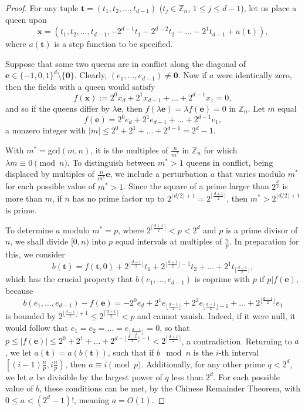 \documentclass[11pt]{article}
\begin{document}
\begin{proof}
For any tuple $\mathbf{t}=(t_1,t_2,\dots,t_{d-1})$ ($t_j\in \mathbb{Z}_n$, $1\le j\le d-1$), let us place a queen upon
$$\mathbf{x}=(t_1,t_2,\dots,t_{d-1},-2^{d-1}t_1-2^{d-2}t_2-\ldots-2^1 t_{d-1}+a(\mathbf{t})),$$
where $a(\mathbf{t})$ is a step function to be specified.

Suppose that some two queens are in conflict along the diagonal of $\mathbf{e}\in \{-1,0,1\}^d\setminus \{\mathbf{0}\}$. Clearly, $(e_1,\dots,e_{d-1})\neq \mathbf{0}$. Now if $a$ were identically zero, then the fields with a queen would satisfy
$$f(\mathbf{x}):=2^0 x_d+2^1x_{d-1}+\ldots +2^{d-1}x_1=0,$$
and so if the queens differ by $\lambda \mathbf{e}$, then $f(\lambda \mathbf{e})=\lambda f(\mathbf{e})=0$ in $\mathbb{Z}_n$. Let $m$ equal
$$f(\mathbf{e})=2^0 e_d+2^1e_{d-1}+\ldots +2^{d-1}e_1,$$ 
a nonzero integer with $|m|\le 2^0+2^1+\ldots +2^{d-1}=2^d-1$. 

With $m^*=\text{gcd}(m,n)$, it is the multiples of $\frac{n}{m^*}$ in $\mathbb{Z}_n$ for which $\lambda m\equiv 0\pmod n$. To distinguish between $m^*>1$ queens in conflict, being displaced by multiples of $\frac{n}{m^*}\mathbf{e}$, we include a perturbation $a$ that varies modulo $m^*$ for each possible value of $m^*>1$. Since the square of a prime larger than $2^{\frac d2}$ is more than $m$, if $n$ has no prime factor up to $2^{\lfloor d/2\rfloor +1}=2^{\lceil \frac{d+1}{2}\rceil}$, then $m^*> 2^{\lfloor d/2\rfloor +1}$ is prime.

To determine $a$ modulo $m^*=p$, where $2^{\lceil \frac{d+1}{2}\rceil}<p<2^d$ and $p$ is a prime divisor of $n$, we shall divide $[0,n)$ into $p$ equal intervals at multiples of $\frac{n}{p}$. In preparation for this, we consider
$$b(\mathbf{t})=f(\mathbf{t},0)+2^{\lfloor \frac{d-1}{2}\rfloor}t_1+2^{\lfloor \frac{d-1}{2}\rfloor-1}t_2+\ldots + 2^1t_{\lfloor \frac{d-1}{2}\rfloor},$$
which has the crucial property that $b(e_1,\ldots,e_{d-1})$ is coprime with $p$ if $p|f(\mathbf{e})$, because
$$b(e_1,\ldots,e_{d-1})-f(\mathbf{e})=-2^0e_d+2^1e_{\lfloor \frac{d-1}{2}\rfloor}+2^2e_{\lfloor \frac{d-1}{2}\rfloor-1}+\ldots +2^{\lfloor \frac{d-1}{2}\rfloor}e_1$$
is bounded by $2^{\lfloor \frac{d-1}{2}\rfloor+1}\le 2^{\lceil \frac{d+1}{2}\rceil}<p$ and cannot vanish. Indeed, if it were null, it would follow that $e_1=e_2=\ldots=e_{\lfloor \frac{d-1}{2}\rfloor}=0$, so that $p\le |f(\mathbf{e})|\le 2^0+2^1+\ldots+2^{d-\lfloor \frac{d-1}{2}\rfloor-1}<2^{\lceil \frac{d+1}{2}\rceil}$, a contradiction. Returning to $a$, we let $a(\mathbf{t})=a(b(\mathbf{t}))$, such that if $b\mod n$ is the $i$-th interval $\left[(i-1)\frac np,i\frac np\right)$, then $a\equiv i\pmod p$. Additionally, for any other prime $q<2^d$, we let $a$ be divisible by the largest power of $q$ less than $2^d$. For each possible value of $b$, these conditions can be met, by the Chinese Remainder Theorem, with $0\le a<(2^d-1)!$, meaning $a=O(1)$.


\end{proof}
\end{document}
